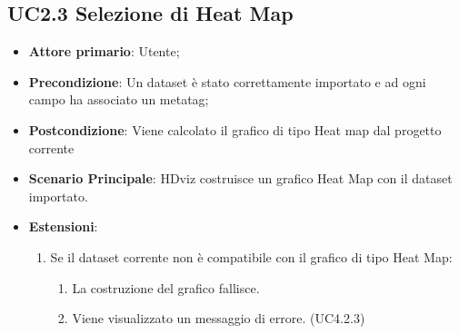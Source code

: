 \subsection{UC2.3 Selezione di Heat Map}
\label{ssub:UC2.3}
\begin{itemize}

    \item \textbf{Attore primario}: Utente;

	\item \textbf{Precondizione}:   Un dataset è stato correttamente importato e ad ogni campo 
									ha associato un metatag;

    \item \textbf{Postcondizione}:  Viene calcolato il grafico di tipo Heat map dal progetto corrente
	\item \textbf{Scenario Principale}: HDviz costruisce un grafico Heat Map con il dataset importato.
	\item \textbf{Estensioni}:
	\begin{enumerate}
		\item Se il dataset corrente non è compatibile con il grafico di tipo Heat Map:
		\begin{enumerate}
			\item La costruzione del grafico fallisce.
			\item Viene visualizzato un messaggio di errore. (UC4.2.3)
		\end{enumerate}
	\end{enumerate}
\end{itemize}


